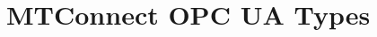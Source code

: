 \documentclass{mtc-opc}	%
\begin{document}
\begin{nolinenumbers}
\color{black}

\clearpage
\tableofcontents
\thispagestyle{fancy}

\clearpage
\listoffigures

\clearpage
\listoftables

\clearpage

\end{nolinenumbers}

\color{black}



\glsresetall
{}


%

%

%

%

%

%

%

%

\clearpage

\section{MTConnect OPC UA Types}\label{mtconnect_information_model}
\FloatBarrier

%

\clearpage

%

\clearpage

\renewcommand{\appendixname}{Annex}
\begin{appendices}
  
\end{appendices}
\end{document}
